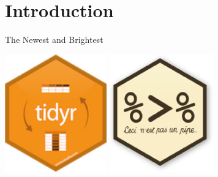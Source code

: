 \section{Introduction}\label{introduction}

\begin{frame}{The Newest and Brightest}

\centerline{\includegraphics[height=2in]{Figures/tidyr_logo.png} \text{  \LARGE    }
\includegraphics[height=2in]{Figures/pipe_logo.png}}

\end{frame}

